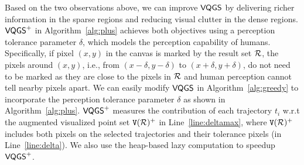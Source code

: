 
Based on the two observations above, we can improve  $\mathsf{VQGS}$ by delivering richer information in the sparse regions and reducing visual clutter in the dense regions.
$\mathsf{VQGS}^+$ in Algorithm~\ref{alg:plus} achieves both objectives using a perception tolerance parameter $\delta$, which models the perception capability of humans.
Specifically, if pixel $(x,y)$ in the canvas is marked by the result set $\mathcal{R}$,
the pixels around $(x,y)$, i.e., from $(x-\delta, y-\delta)$ to $(x+\delta, y+\delta)$, do not need to be marked as they are close to the pixels in $\mathcal{R}$ and human perception cannot tell nearby pixels apart. We can easily modify $\mathsf{VQGS}$ in Algorithm~\ref{alg:greedy} to incorporate the perception tolerance parameter $\delta$ as shown in Algorithm~\ref{alg:plus}.
$\mathsf{VQGS}^+$ measures the contribution of each trajectory $t_i$ w.r.t the augmented visualized point set $\mathtt{V}(\mathcal{R})^{+}$ in Line~\ref{line:deltamax},
where $\mathtt{V}(\mathcal{R})^{+}$ includes both pixels on the selected trajectories and their tolerance pixels (in Line~\ref{line:delta}).
We also use the heap-based lazy computation to speedup $\mathsf{VQGS}^+$.






